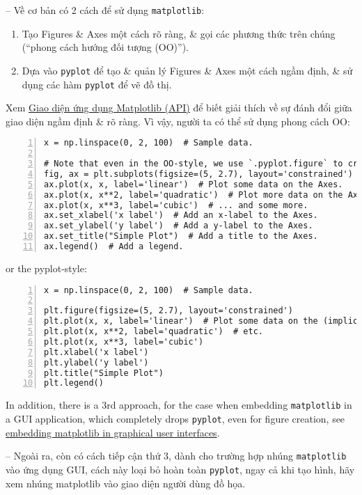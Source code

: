 \documentclass{article}
\begin{document}
-- Về cơ bản có 2 cách để sử dụng {\tt matplotlib}:
\begin{enumerate}
    \item Tạo Figures \& Axes một cách rõ ràng, \& gọi các phương thức trên chúng (``phong cách hướng đối tượng (OO)'').
    \item Dựa vào {\tt pyplot} để tạo \& quản lý Figures \& Axes một cách ngầm định, \& sử dụng các hàm {\tt pyplot} để vẽ đồ thị.
\end{enumerate}
Xem \href{https://matplotlib.org/stable/users/explain/figure/api_interfaces.html#api-interfaces}{Giao diện ứng dụng Matplotlib (API)} để biết giải thích về sự đánh đổi giữa giao diện ngầm định \& rõ ràng. Vì vậy, người ta có thể sử dụng phong cách OO:
\begin{Verbatim}[numbers=left,xleftmargin=5mm]
x = np.linspace(0, 2, 100)  # Sample data.

# Note that even in the OO-style, we use `.pyplot.figure` to create the Figure.
fig, ax = plt.subplots(figsize=(5, 2.7), layout='constrained')
ax.plot(x, x, label='linear')  # Plot some data on the Axes.
ax.plot(x, x**2, label='quadratic')  # Plot more data on the Axes...
ax.plot(x, x**3, label='cubic')  # ... and some more.
ax.set_xlabel('x label')  # Add an x-label to the Axes.
ax.set_ylabel('y label')  # Add a y-label to the Axes.
ax.set_title("Simple Plot")  # Add a title to the Axes.
ax.legend()  # Add a legend.
\end{Verbatim}
or the pyplot-style:
\begin{Verbatim}[numbers=left,xleftmargin=5mm]
x = np.linspace(0, 2, 100)  # Sample data.

plt.figure(figsize=(5, 2.7), layout='constrained')
plt.plot(x, x, label='linear')  # Plot some data on the (implicit) Axes.
plt.plot(x, x**2, label='quadratic')  # etc.
plt.plot(x, x**3, label='cubic')
plt.xlabel('x label')
plt.ylabel('y label')
plt.title("Simple Plot")
plt.legend()
\end{Verbatim}
In addition, there is a 3rd approach, for the case when embedding {\tt matplotlib} in a GUI application, which completely drops {\tt pyplot}, even for figure creation, see \href{https://matplotlib.org/stable/gallery/user_interfaces/index.html#user-interfaces}{embedding matplotlib in graphical user interfaces}.

-- Ngoài ra, còn có cách tiếp cận thứ 3, dành cho trường hợp nhúng {\tt matplotlib} vào ứng dụng GUI, cách này loại bỏ hoàn toàn {\tt pyplot}, ngay cả khi tạo hình, hãy xem nhúng matplotlib vào giao diện người dùng đồ họa.
\end{document}
